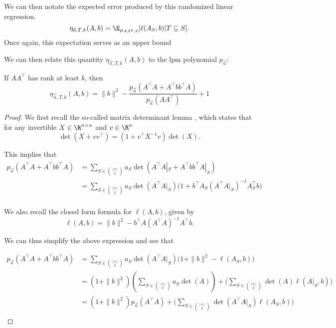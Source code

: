 We can then notate the expected error produced by this randomized linear regression.
\[
    \eta_{\vec{a}, T, k}(A,b) = \E_{\mu_{AA^{\intercal},\vec{a}}} [\ell(A_S, b) | T \subseteq S].
\]
Once again, this expectation serves as an upper bound 

We can then relate this quantity $\eta_{\vec{a}, T, k}(A, b)$ to the lpm polynomial $p_{\vec{a}}$:
\begin{theorem}
    If $AA^{\intercal}$ has rank at least $k$, then
\[
     \eta_{\vec{a}, T, k}(A,b) =
     \|b\|^2 - 
     \frac{p_{\vec{a}}(A^{\intercal}A + A^{\intercal}bb^{\intercal}A)}{p_{\vec{a}}(AA^{\intercal})} + 1
 \]
\end{theorem}
\begin{proof}
    We first recall the so-called matrix determinant lemma \cite{TODO}, which states that for any invertible $X \in \R^{n\times n }$ and $v \in \R^{n}$
    \[
        \det(X + vv^{\intercal}) = (1+v^{\intercal}X^{-1}v)\det(X).
    \]

    This implies that
    \begin{align*}
        p_{\vec{a}}(A^{\intercal}A + A^{\intercal}bb^{\intercal}A) &= \sum_{S \in \binom{[n]}{k}} a_S\det(A^{\intercal}A|_S + A^{\intercal}bb^{\intercal}A|_S)\\
                                                                   &= \sum_{S \in \binom{[n]}{k}} a_S\det(A^{\intercal}A|_S)\big(1+b^{\intercal}A_S(A^{\intercal}A|_S)^{-1}A_S^{\intercal}b\big)\\
    \end{align*}

    We also recall the closed form formula for $\ell(A,b)$, given by
    \[
        \ell(A,b) = \|b\|^2 - b^{\intercal}A(A^{\intercal}A)^{-1}A^{\intercal}b.
    \]

    We can thus simplify the above expression and see that

    \begin{align*}
        p_{\vec{a}}(A^{\intercal}A + A^{\intercal}bb^{\intercal}A) &= \sum_{S \in \binom{[n]}{k}} a_S\det(A^{\intercal}A|_S)\big(1+\|b\|^2-\ell(A_S,b)\big)\\
                                                                   &= (1+\|b\|^2)\left( \sum_{S \in \binom{[n]}{k}} a_S\det(A) \right) + \big(\sum_{S \in \binom{[n]}{k}}\det(A)\ell(A|_S,b)\big)\\
                                                                   &= (1+\|b\|^2)p_{\vec{a}}(A^{\intercal}A) + \big(\sum_{S \in \binom{[n]}{k}}\det(A^{\intercal}A|_S)\ell(A_S,b)\big)\\
    \end{align*}


\end{proof}
